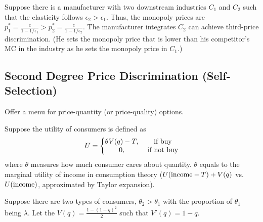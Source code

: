 \documentclass[11pt]{elegantbook}
\begin{document}
\begin{example}
    Suppose there is a manufacturer with two downstream industries $C_1$ and $C_2$ such that the elasticity follows $\epsilon_2>\epsilon_1$. Thus, the monopoly prices are $p_1^*=\frac{c}{1-1/\epsilon_1}>p_2^*=\frac{c}{1-1/\epsilon_2}$. The manufacturer integrates $C_2$ can achieve third-price discrimination. (He sets the monopoly price that is lower than his competitor's MC in the industry as he sets the monopoly price in $C_1$.)
\end{example}

\subsection{Second Degree Price Discrimination (Self-Selection)}
Offer a menu for price-quantity (or price-quality) options.

Suppose the utility of consumers is defined as
\begin{equation}
    \begin{aligned}
        U=\left\{\begin{matrix}
            \theta V(q)-T,& \textnormal{ if buy}\\
            0,& \textnormal{ if not buy}
        \end{matrix}\right.
    \end{aligned}
    \nonumber
\end{equation}
where $\theta$ measures how much consumer cares about quantity. $\theta$ equals to the marginal utility of income in consumption theory ($U(\textnormal{income}-T)+V(q)$ vs. $U(\textnormal{income})$, approximated by Taylor expansion).

Suppose there are two types of consumers, $\theta_2>\theta_1$ with the proportion of $\theta_1$ being $\lambda$. Let the $V(q)=\frac{1-(1-q)^2}{2}$ such that $V'(q)=1-q$.
\end{document}
